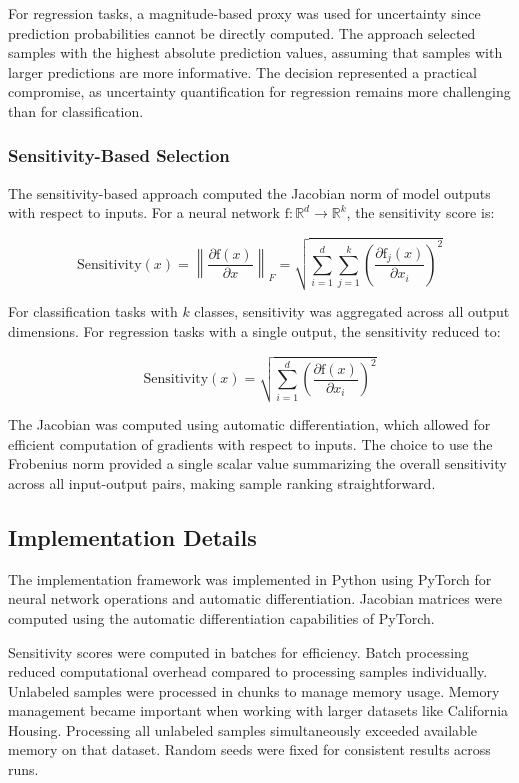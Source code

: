 \documentclass[conference]{IEEEtran}
\newcommand{\func}[1]{\mathrm{#1}}
\begin{document}
For regression tasks, a magnitude-based proxy was used for uncertainty since prediction probabilities cannot be directly computed. The approach selected samples with the highest absolute prediction values, assuming that samples with larger predictions are more informative. The decision represented a practical compromise, as uncertainty quantification for regression remains more challenging than for classification.

\subsubsection{Sensitivity-Based Selection}

The sensitivity-based approach computed the Jacobian norm of model outputs with respect to inputs. For a neural network $\func{f}: \mathbb{R}^d \rightarrow \mathbb{R}^k$, the sensitivity score is:

\begin{equation}
\text{Sensitivity}(x) = \left\|\frac{\partial \func{f}(x)}{\partial x}\right\|_F = \sqrt{\sum_{i=1}^d \sum_{j=1}^k \left(\frac{\partial \func{f}_j(x)}{\partial x_i}\right)^2}
\end{equation}

For classification tasks with $k$ classes, sensitivity was aggregated across all output dimensions. For regression tasks with a single output, the sensitivity reduced to:

\begin{equation}
\text{Sensitivity}(x) = \sqrt{\sum_{i=1}^d \left(\frac{\partial \func{f}(x)}{\partial x_i}\right)^2}
\end{equation}

The Jacobian was computed using automatic differentiation, which allowed for efficient computation of gradients with respect to inputs. The choice to use the Frobenius norm provided a single scalar value summarizing the overall sensitivity across all input-output pairs, making sample ranking straightforward.

\subsection{Implementation Details}

The implementation framework was implemented in Python using PyTorch for neural network operations and automatic differentiation. Jacobian matrices were computed using the automatic differentiation capabilities of PyTorch.

Sensitivity scores were computed in batches for efficiency. Batch processing reduced computational overhead compared to processing samples individually. Unlabeled samples were processed in chunks to manage memory usage. Memory management became important when working with larger datasets like California Housing. Processing all unlabeled samples simultaneously exceeded available memory on that dataset. Random seeds were fixed for consistent results across runs.
\end{document}
